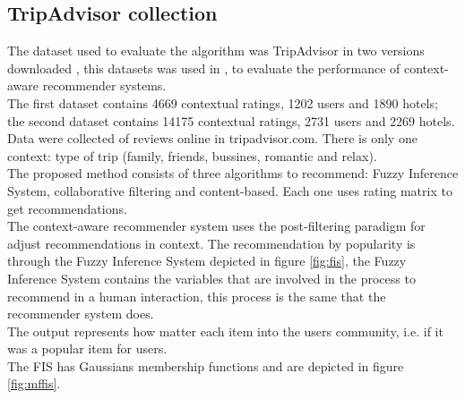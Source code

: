 \subsection{TripAdvisor collection} 

The dataset used to evaluate the algorithm was TripAdvisor in two
versions downloaded \cite{linkzeng}, this datasets was used in
\cite{zheng2014context}, \cite{zheng2012differential} to  evaluate the
performance of context-aware recommender systems. \\  The first
dataset contains 4669 contextual ratings, 1202 users and 1890 hotels;
the second dataset contains 14175 contextual ratings, 2731 users and
2269 hotels. Data were collected of reviews online in tripadvisor.com.
There is only one context: type of trip (family, friends, bussines,
romantic and relax).\\ 
The proposed method consists of three algorithms to recommend: Fuzzy
Inference System, collaborative filtering and content-based. Each one
uses rating matrix to get recommendations.\\    
The context-aware recommender system uses the post-filtering
paradigm\cite{adomavicius2011context} for adjust recommendations in
context. The recommendation by popularity is through the Fuzzy
Inference System depicted in figure \ref{fig:fis}, the Fuzzy Inference
System contains the variables that are involved in the process to
recommend in a human interaction, this process is the same that the
recommender system does. \\The output represents how matter each item
into the users community, i.e. if it was a popular item for users. \\
The FIS has Gaussians membership functions and are depicted in figure
\ref{fig:mffis}.
